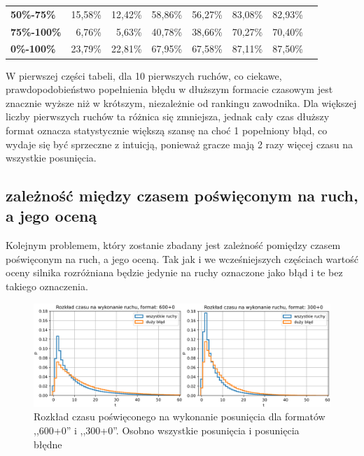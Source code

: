 \documentclass[inzynierska]{pwr_wmat_praca_dyplomowa}
\theoremstyle{plain}
\numberwithin{theorem}{chapter}
\theoremstyle{definition}
\numberwithin{theorem}{chapter}
\begin{document}
\begin{table}[H]
\begin{tabular}{|l|r|r|r|r|r|r|l}
		\textbf{50\%-75\%}                                                      & 15,58\%                             & 12,42\%                             & 58,86\%                             & 56,27\%                             & 83,08\%                             & 82,93\%                             &           \\ \cline{1-7}
		\textbf{75\%-100\%}                                                     & 6,76\%                              & 5,63\%                              & 40,78\%                             & 38,66\%                             & 70,27\%                             & 70,40\%                             &           \\ \cline{1-7}
		\textbf{0\%-100\%}                                                     & 23,79\%                              & 22,81\%                              & 67,95\%                             & 67,58\%                             & 87,11\%                             & 87,50\%                             &           \\ \cline{1-7}
	\end{tabular}
	\label{tab:blad_w_n_ruchach} 
\end{table}
W pierwszej części tabeli, dla 10 pierwszych ruchów, co ciekawe, prawdopodobieństwo popełnienia błędu w dłuższym formacie czasowym jest znacznie wyższe niż w krótszym, niezależnie od rankingu zawodnika. Dla większej liczby pierwszych ruchów ta różnica się zmniejsza, jednak cały czas dłuższy format oznacza statystycznie większą szansę na choć 1 popełniony błąd, co wydaje się być sprzeczne z intuicją, ponieważ gracze mają 2 razy więcej czasu na wszystkie posunięcia.

\subsection{zależność między czasem poświęconym na ruch, a jego oceną}


Kolejnym problemem, który zostanie zbadany jest zależność pomiędzy czasem poświęconym na ruch, a jego oceną. Tak jak i we wcześniejszych częściach wartość oceny silnika rozróżniana będzie jedynie na ruchy oznaczone jako błąd i te bez takiego oznaczenia.
\begin{figure}[H]
	\centering
	\includegraphics[width=\textwidth]{rozklad_czasu.png}
	\caption{Rozkład czasu poświęconego na wykonanie posunięcia dla formatów ,,600+0'' i ,,300+0''. Osobno wszystkie posunięcia i posunięcia błędne}
	\label{rys:rozklad_czasu}
\end{figure}
\end{document}
